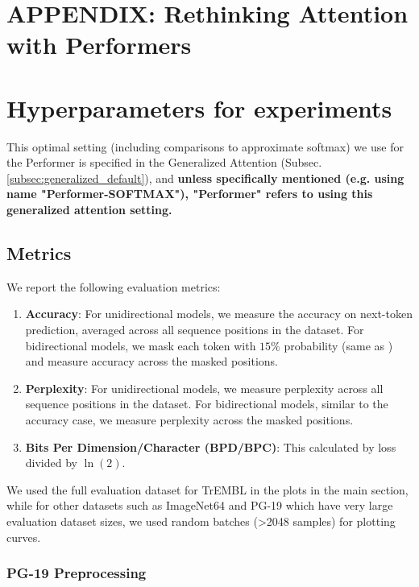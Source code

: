 \section*{APPENDIX: Rethinking Attention with Performers}
\setcounter{section}{0}
\renewcommand{\thesection}{\Alph{section}}
\label{sec:appendix}

\section{Hyperparameters for experiments}
\label{appendix:hyperparameters}
This optimal setting (including comparisons to approximate softmax) we use for the Performer is specified in the Generalized Attention (Subsec. \ref{subsec:generalized_default}), and \textbf{unless specifically mentioned (e.g. using name "Performer-SOFTMAX"), "Performer" refers to using this generalized attention setting.}

\subsection{Metrics}
We report the following evaluation metrics:
\vspace{-3mm}
\begin{enumerate}[itemsep=0.2mm]
\item \textbf{Accuracy}: For unidirectional models, we measure the accuracy on next-token prediction, averaged across all sequence positions in the dataset. For bidirectional models, we mask each token with $15\%$ probability (same as \citep{bert}) and measure accuracy across the masked positions.
\item \textbf{Perplexity}: For unidirectional models, we measure perplexity across all sequence positions in the dataset. For bidirectional models, similar to the accuracy case, we measure perplexity across the masked positions.
\item \textbf{Bits Per Dimension/Character (BPD/BPC)}: This calculated by loss divided by $\ln(2)$.
\end{enumerate}
\vspace{-3mm}
We used the full evaluation dataset for TrEMBL in the plots in the main section, while for other datasets such as ImageNet64 and PG-19 which have very large evaluation dataset sizes, we used random batches (>2048 samples) for plotting curves. 

\subsubsection{PG-19 Preprocessing}


